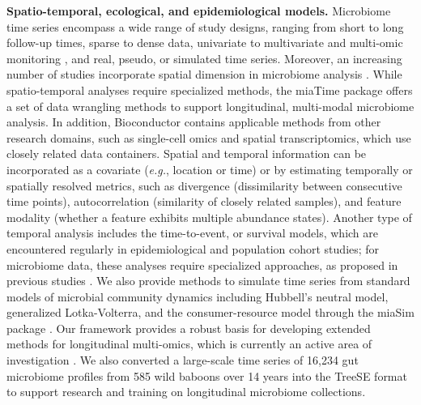 \documentclass[
  sn-nature,
]{sn-jnl}
\begin{document}
\textbf{Spatio-temporal, ecological, and epidemiological models.}
Microbiome time series \citep{berg2020} encompass a wide range of study
designs, ranging from short to long follow-up times, sparse to dense
data, univariate to multivariate and multi-omic monitoring
\citep{velten2022, sherwani2025, fukuyama2017}, and real, pseudo, or
simulated time series. Moreover, an increasing number of studies
incorporate spatial dimension in microbiome analysis
\citep{ruuskanen2021}. While spatio-temporal analyses require
specialized methods, the miaTime package offers a set of data wrangling
methods to support longitudinal, multi-modal microbiome analysis. In
addition, Bioconductor contains applicable methods from other research
domains, such as single-cell omics and spatial transcriptomics, which
use closely related data containers. Spatial and temporal information
can be incorporated as a covariate (\emph{e.g.}, location or time) or by
estimating temporally or spatially resolved metrics, such as divergence
(dissimilarity between consecutive time points), autocorrelation
(similarity of closely related samples), and feature modality (whether a
feature exhibits multiple abundance states). Another type of temporal
analysis includes the time-to-event, or survival models, which are
encountered regularly in epidemiological and population cohort studies;
for microbiome data, these analyses require specialized approaches, as
proposed in previous studies \citep{salosensaari2021}. We also provide
methods to simulate time series from standard models of microbial
community dynamics including Hubbell's neutral model, generalized
Lotka-Volterra, and the consumer-resource model through the miaSim
package \citep{gao2023}. Our framework provides a robust basis for
developing extended methods for longitudinal multi-omics, which is
currently an active area of investigation \citep{sherwani2025}. We also
converted a large-scale time series of 16,234 gut microbiome profiles
from 585 wild baboons over 14 years \citep{grieneisen2021} into the
TreeSE format to support research and training on longitudinal
microbiome collections.
\end{document}
